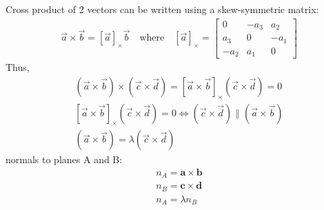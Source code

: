 \documentclass[journal]{IEEEtran}
\begin{document}
Cross product of 2 vectors can be written using a skew-symmetric matrix:
\begin{align}
\vec{a} \times \vec{b} = [\vec{a}]_{\times} \vec{b} \quad \text{where} \quad [\vec{a}]_{\times} = \begin{bmatrix}0 & -a_3 & a_2 \\a_3 & 0 & -a_1 \\-a_2 & a_1 & 0\end{bmatrix}
\end{align}
Thus,
\begin{align}
(\vec{a} \times \vec{b}) \times (\vec{c} \times \vec{d}) = [\vec{a} \times \vec{b}]_{\times}(\vec{c} \times \vec{d}) = 0\\
[\vec{a} \times \vec{b}]_{\times}(\vec{c} \times \vec{d}) = 0 \iff (\vec{c} \times \vec{d}) \parallel (\vec{a} \times \vec{b})\\
(\vec{a} \times \vec{b}) = \lambda(\vec{c} \times\vec{d})
\end{align}
normals to planes A and B:
\begin{align}
n_A = \mathbf{a} \times \mathbf{b}\\
n_B = \mathbf{c} \times \mathbf{d}\\
n_A = \lambda n_B
\end{align}
\end{document}
